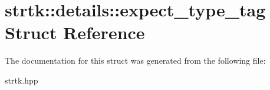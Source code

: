 \hypertarget{structstrtk_1_1details_1_1expect__type__tag}{\section{strtk\-:\-:details\-:\-:expect\-\_\-type\-\_\-tag Struct Reference}
\label{structstrtk_1_1details_1_1expect__type__tag}
}


The documentation for this struct was generated from the following file\-:\begin{DoxyCompactItemize}
\item 
strtk.\-hpp\end{DoxyCompactItemize}
